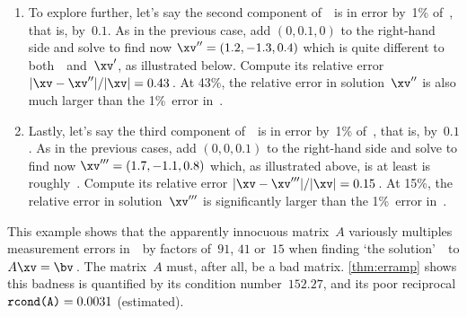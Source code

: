 \begin{example}
\begin{enumerate}
\item To explore further, let's say the second component of~\bv\ is in error by~1\% of~\bv, that is, by~\(0.1\).
As in the previous case, add \((0,0.1,0)\) to the right-hand side and solve to find now \(\xv''=(1.2,-1.3,0.4)\) which is quite different to both~\xv\ and~\(\xv'\), as illustrated below.
Compute its relative error \(|\xv-\xv''|/|\xv|=0.43\)\,.
At 43\%, the relative error in solution~\(\xv''\) is also much larger than the 1\%~error in~\bv.
\begin{center}
\end{center}

\item Lastly, let's say the third component of~\bv\ is in error by~1\% of~\bv, that is, by~\(0.1\).
As in the previous cases, add \((0,0,0.1)\) to the right-hand side and solve to find now \(\xv'''=(1.7,-1.1,0.8)\) which, as illustrated above, is at least is roughly~\xv.
Compute its relative error \(|\xv-\xv'''|/|\xv|=0.15\)\,.
At 15\%, the relative error in solution~\(\xv'''\) is significantly larger than the 1\%~error in~\bv.

\end{enumerate}
This example shows that the apparently innocuous matrix~\(A\) variously multiples measurement errors in~\bv\ by factors of~\(91\), \(41\) or~\(15\) when finding `the solution'~\xv\ to \(A\xv=\bv\)\,.
The matrix~\(A\) must, after all, be a bad matrix.
\autoref{thm:erramp} shows this badness is quantified by its  condition number~\(152.27\), and its poor reciprocal \(\verb|rcond(A)|=0.0031\) (estimated). 
\end{example}




